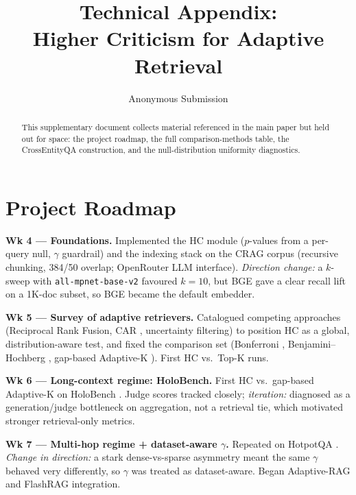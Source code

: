 \documentclass[letterpaper]{article} %
\title{Technical Appendix:\\Higher Criticism for Adaptive Retrieval}
\author{Anonymous Submission}
\begin{document}
\maketitle

\begin{abstract}
This supplementary document collects material referenced in the main
paper but held out for space: the project roadmap, the full
comparison-methods table, the CrossEntityQA construction, and the
null-distribution uniformity diagnostics.
\end{abstract}

\section{Project Roadmap}
\label{app:roadmap}
\small

\textbf{Wk 4 --- Foundations.} Implemented the HC module ($p$-values from a per-query null, $\gamma$ guardrail) and the indexing stack on the CRAG \citep{crag2024} corpus (recursive chunking, 384/50 overlap; OpenRouter LLM interface). \emph{Direction change:} a $k$-sweep with \texttt{all-mpnet-base-v2} favoured $k{=}10$, but BGE \citep{bgeembeddings2023} gave a clear recall lift on a 1K-doc subset, so BGE became the default embedder.

\textbf{Wk 5 --- Survey of adaptive retrievers.} Catalogued competing approaches (Reciprocal Rank Fusion, CAR \citep{xu2025car}, uncertainty filtering) to position HC as a global, distribution-aware test, and fixed the comparison set (Bonferroni \citep{bonferroni1961dunn}, Benjamini--Hochberg \citep{benjamini1995fdr}, gap-based Adaptive-K \citep{adaptivek2025}). First HC vs.\ Top-K runs.

\textbf{Wk 6 --- Long-context regime: HoloBench.} First HC vs.\ gap-based Adaptive-K on HoloBench \citep{maekawa2024holobench}. Judge scores tracked closely; \emph{iteration:} diagnosed as a generation/judge bottleneck on aggregation, not a retrieval tie, which motivated stronger retrieval-only metrics.

\textbf{Wk 7 --- Multi-hop regime + dataset-aware $\gamma$.} Repeated on HotpotQA \citep{yang2018hotpotqa}. \emph{Change in direction:} a stark dense-vs-sparse asymmetry meant the same $\gamma$ behaved very differently, so $\gamma$ was treated as dataset-aware. Began Adaptive-RAG \citep{jeong2024adaptiverag} and FlashRAG \citep{jin2025flashrag} integration.
\end{document}

